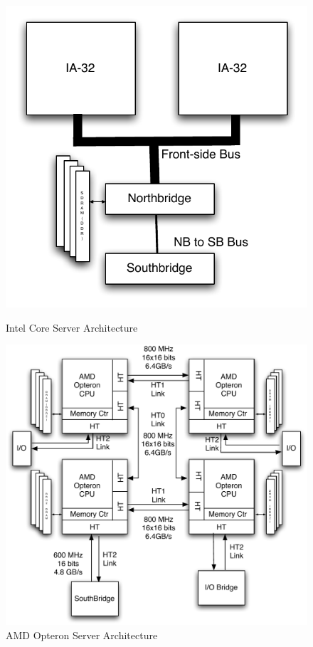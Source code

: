 \documentclass[times, 10pt,onecolumn]{article}
\begin{document}
\begin{figure}[ht]
  \begin{minipage}[b]{0.5\linewidth}
     \centering
     \includegraphics[scale=0.50]{intelarch.pdf}
     \caption{Intel Core Server Architecture}
     \label{fig:intarch}
   \end{minipage}
   \hspace{0.5cm}
   \begin{minipage}[b]{0.5\linewidth}
     \centering
     \includegraphics[scale=0.50]{amdhtarch1.pdf}
     \caption{AMD Opteron Server Architecture}
     \label{fig:amdarch}
   \end{minipage}
\end{figure}
\end{document}
